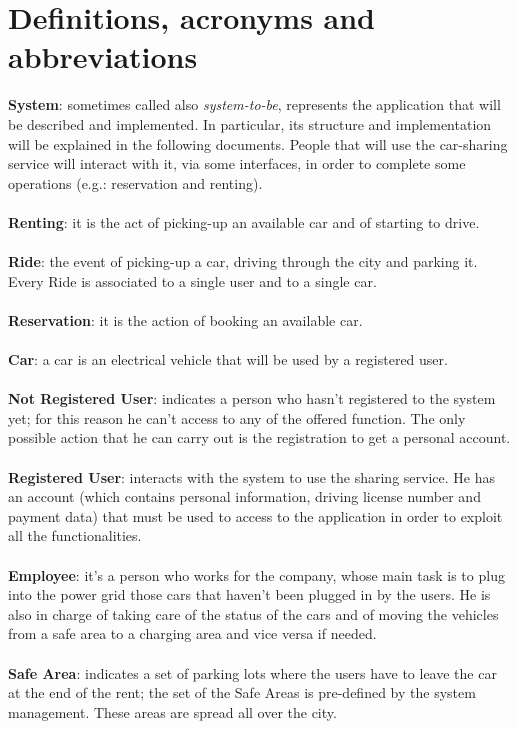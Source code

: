 \documentclass[11pt,a4paper]{report}
\begin{document}
\section{Definitions, acronyms and abbreviations}
\textbf{System}: sometimes called also \textit{system-to-be}, represents the application that will be described and implemented.
In particular, its structure and implementation will be explained in the following documents. People that will use the car-sharing service will interact with it, via some interfaces, in order to complete some operations (e.g.: reservation and renting).\\
\noindent \\
\textbf{Renting}: it is the act of picking-up an available car and of starting to drive.\\
\noindent \\
\textbf{Ride}: the event of picking-up a car, driving through the city and parking it. Every Ride is associated to a single user and to a single car.\\
\noindent \\
\textbf{Reservation}: it is the action of booking an available car.\\
\noindent \\ 
\textbf{Car}: a car is an electrical vehicle that will be used by a registered user. \\
\noindent \\
\textbf{Not Registered User}: indicates a person who hasn't registered to the system yet; for this reason he can't access to any of the offered function. The only possible action that he can carry out is the registration to get a personal account.\\ 
\indent \\
\textbf{Registered User}: interacts with the system to use the sharing service. He has an account (which contains personal information, driving license number and payment data) that must be used to access to the application in order to exploit all the functionalities. \\
\noindent \\
\textbf{Employee}: it's a person who works for the company, whose main task is to plug into the power grid those cars that haven't been plugged in by the users. He is also in charge of taking care of the status of the cars and of moving the vehicles from a safe area to a charging area and vice versa if needed.\\
\noindent \\
\textbf{Safe Area}: indicates a set of parking lots where the users have to leave the car at the end of the rent; the set of the Safe Areas is pre-defined by the system management. These areas are spread all over the city.\\
\end{document}
